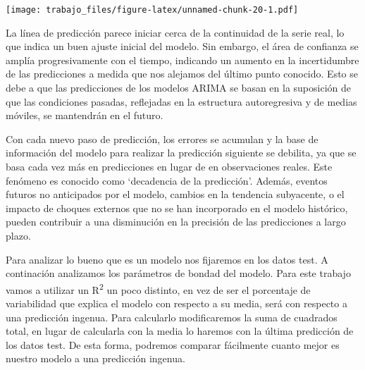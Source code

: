 \documentclass[
]{article}
\begin{document}
\texttt{[image: trabajo\_files/figure-latex/unnamed-chunk-20-1.pdf]}

La línea de predicción parece iniciar cerca de la continuidad de la
serie real, lo que indica un buen ajuste inicial del modelo. Sin
embargo, el área de confianza se amplía progresivamente con el tiempo,
indicando un aumento en la incertidumbre de las predicciones a medida
que nos alejamos del último punto conocido. Esto se debe a que las
predicciones de los modelos ARIMA se basan en la suposición de que las
condiciones pasadas, reflejadas en la estructura autoregresiva y de
medias móviles, se mantendrán en el futuro.

Con cada nuevo paso de predicción, los errores se acumulan y la base de
información del modelo para realizar la predicción siguiente se
debilita, ya que se basa cada vez más en predicciones en lugar de en
observaciones reales. Este fenómeno es conocido como `decadencia de la
predicción'. Además, eventos futuros no anticipados por el modelo,
cambios en la tendencia subyacente, o el impacto de choques externos que
no se han incorporado en el modelo histórico, pueden contribuir a una
disminución en la precisión de las predicciones a largo plazo.

Para analizar lo bueno que es un modelo nos fijaremos en los datos test.
A continación analizamos los parámetros de bondad del modelo. Para este
trabajo vamos a utilizar un R\textsuperscript{2} un poco distinto, en
vez de ser el porcentaje de variabilidad que explica el modelo con
respecto a su media, será con respecto a una predicción ingenua. Para
calcularlo modificaremos la suma de cuadrados total, en lugar de
calcularla con la media lo haremos con la última predicción de los datos
test. De esta forma, podremos comparar fácilmente cuanto mejor es
nuestro modelo a una predicción ingenua.
\end{document}
